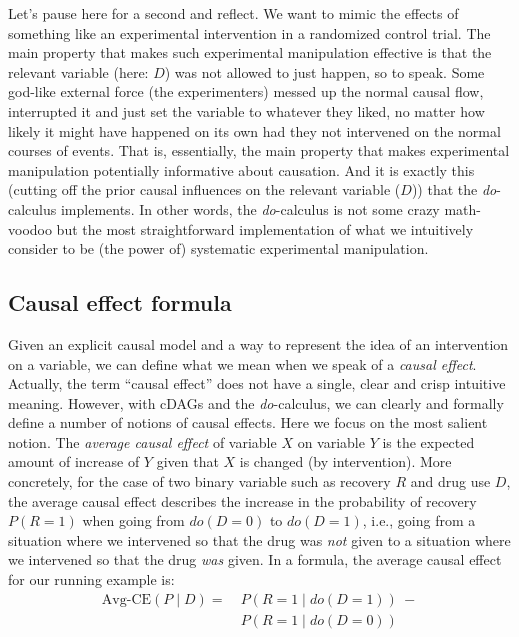 \documentclass[nobib]{tufte-handout}
\newcommand{\docalc}{\emph{do}-calculus\xspace}
\newcommand{\mathdo}{\mathit{do}}
\begin{document}
Let's pause here for a second and reflect.
We want to mimic the effects of something like an experimental intervention in a randomized control trial.
The main property that makes such experimental manipulation effective is that the relevant variable (here: $D$) was not allowed to just happen, so to speak.
Some god-like external force (the experimenters) messed up the normal causal flow, interrupted it and just set the variable to whatever they liked, no matter how likely it might have happened on its own had they not intervened on the normal courses of events.
That is, essentially, the main property that makes experimental manipulation potentially informative about causation.
And it is exactly this (cutting off the prior causal influences on the relevant variable ($D$)) that the \docalc implements.
In other words, the \docalc is not some crazy math-voodoo but the most straightforward implementation of what we intuitively consider to be (the power of) systematic experimental manipulation.

\subsection{Causal effect formula} \label{sec:causal-effect-formula}

Given an explicit causal model and a way to represent the idea of an intervention on a variable, we can define what we mean when we speak of a \textit{causal effect}.
Actually, the term ``causal effect'' does not have a single, clear and crisp intuitive meaning.
However, with cDAGs and the \docalc, we can clearly and formally define a number of notions of causal effects.
Here we focus on the most salient notion.
The \textit{average causal effect} of variable $X$ on variable $Y$ is the expected amount of increase of $Y$ given that $X$ is changed (by intervention).
More concretely, for the case of two binary variable such as recovery $R$ and drug use $D$, the average causal effect describes the increase in the probability of recovery $P(R = 1)$ when going from $\mathdo(D=0)$ to $\mathdo(D=1)$, i.e., going from a situation where we intervened so that the drug was \textit{not} given to a situation where we intervened so that the drug \textit{was} given.
In a formula, the average causal effect for our running example is:
\begin{align*}
  \text{Avg-CE}(P \mid D) = & \ P(R=1 \mid \mathdo(D=1)) \  -
                        \\ & \ P(R=1 \mid \mathdo(D=0))
\end{align*}
\end{document}
